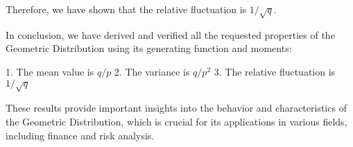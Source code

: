Therefore, we have shown that the relative fluctuation is $1/\sqrt{q}$.

In conclusion, we have derived and verified all the requested properties of the Geometric Distribution using its generating function and moments:

1. The mean value is $q/p$
2. The variance is $q/p^2$
3. The relative fluctuation is $1/\sqrt{q}$

These results provide important insights into the behavior and characteristics of the Geometric Distribution, which is crucial for its applications in various fields, including finance and risk analysis.